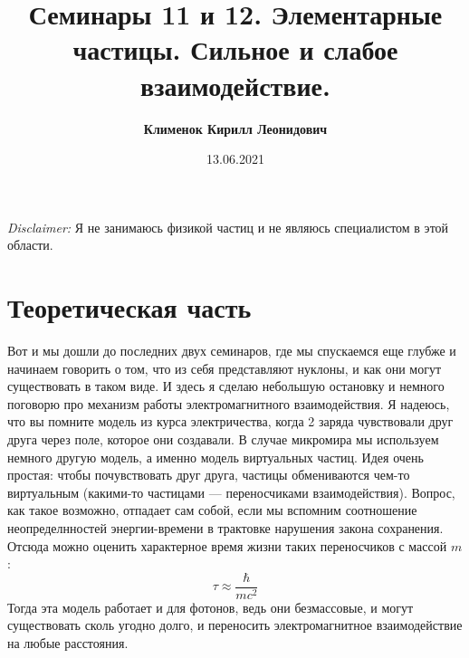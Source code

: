 \documentclass[12pt]{article}
\begin{document}
 
\title{\textbf{Семинары 11 и 12. Элементарные частицы. Сильное и слабое взаимодействие.}}
\author{\textbf{Клименок Кирилл Леонидович}}
\date{13.06.2021}
\maketitle
\begin{center}
   \textit{Disclaimer:} Я не занимаюсь физикой частиц и не являюсь специалистом в этой области. 
\end{center}

\section{Теоретическая часть}
Вот и мы дошли до последних двух семинаров, где мы спускаемся еще глубже и начинаем говорить о том, что из себя представляют нуклоны, и как они могут существовать в таком виде. И здесь я сделаю небольшую остановку и немного поговорю про механизм работы электромагнитного взаимодействия. Я надеюсь, что вы помните модель из курса электричества, когда 2 заряда чувствовали друг друга через поле, которое они создавали. В случае микромира мы используем немного другую модель, а именно модель виртуальных частиц. Идея очень простая: чтобы почувствовать друг друга, частицы обмениваются чем-то виртуальным (какими-то частицами --- переносчиками взаимодействия). Вопрос, как такое возможно, отпадает сам собой, если мы вспомним соотношение неопределнностей энергии-времени в трактовке нарушения закона сохранения. Отсюда можно оценить характерное время жизни таких переносчиков с массой $m$:
\begin{equation*}
    \tau \approx \dfrac{\hbar}{mc^2}
\end{equation*}
Тогда эта модель работает и для фотонов, ведь они безмассовые, и могут существовать сколь угодно долго, и переносить электромагнитное взаимодействие на любые расстояния.
\end{document}
